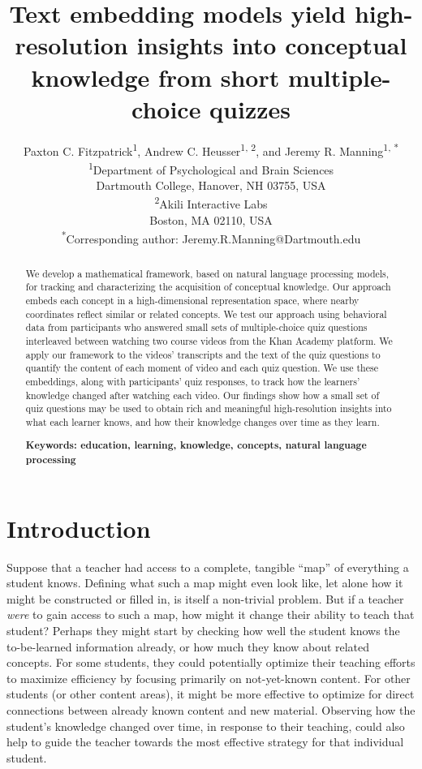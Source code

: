 \documentclass[10pt]{article}
\title{Text embedding models yield high-resolution insights into conceptual
knowledge from short multiple-choice quizzes}
\author{Paxton C. Fitzpatrick\textsuperscript{1},
Andrew C. Heusser\textsuperscript{1, 2}, and Jeremy R.
Manning\textsuperscript{1, *}\\\small{\textsuperscript{1}Department of Psychological and Brain Sciences}\\\small{Dartmouth College, Hanover, NH 03755, USA}\\\small{\textsuperscript{2}Akili Interactive Labs}\\\small{Boston, MA 02110, USA}\\\small{\textsuperscript{*}Corresponding author:
Jeremy.R.Manning@Dartmouth.edu}}
\date{}
\begin{document}
\maketitle

\begin{abstract}\noindent We develop a mathematical framework, based on natural
language processing models, for tracking and characterizing the acquisition of
conceptual knowledge. Our approach embeds each concept in a high-dimensional
representation space, where nearby coordinates reflect similar or related
concepts. We test our approach using behavioral data from participants who
answered small sets of multiple-choice quiz questions interleaved between
watching two course videos from the Khan Academy platform. We apply our
framework to the videos' transcripts and the text of the quiz questions to
quantify the content of each moment of video and each quiz question. We use
these embeddings, along with participants' quiz responses, to track how the
learners' knowledge changed after watching each video. Our findings show how a
small set of quiz questions may be used to obtain rich and meaningful
high-resolution insights into what each learner knows, and how their knowledge
changes over time as they learn.

\textbf{Keywords: education, learning, knowledge, concepts, natural language processing}

\end{abstract}


\section*{Introduction}

Suppose that a teacher had access to a complete, tangible ``map'' of everything
a student knows. Defining what such a map might even look like, let alone how it
might be constructed or filled in, is itself a non-trivial problem. But if a
teacher \textit{were} to gain access to such a map, how might it change their
ability to teach that student? Perhaps they might start by checking how well
the student knows the to-be-learned information already, or how much they know
about related concepts. For some students, they could potentially optimize
their teaching efforts to maximize efficiency by focusing primarily on
not-yet-known content. For other students (or other content areas), it might be
more effective to optimize for direct connections between already known content
and new material. Observing how the student's knowledge changed over time, in
response to their teaching, could also help to guide the teacher towards the
most effective strategy for that individual student.
\end{document}
